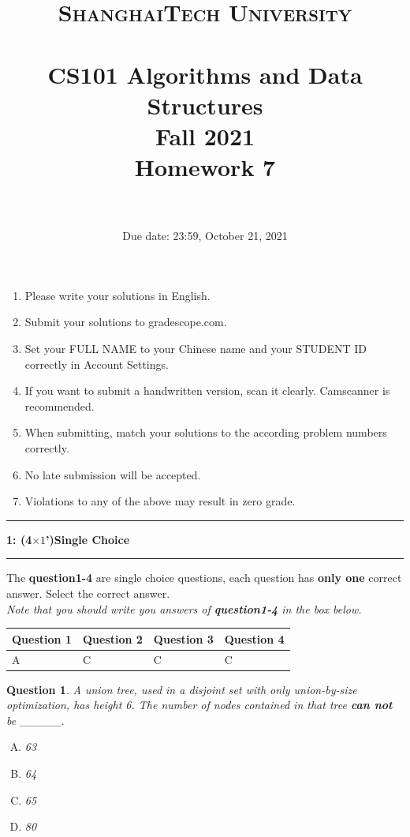 \documentclass[10.5pt]{article}
\title{
	\normalfont \normalsize
	\textsc{ShanghaiTech University} \\ [25pt]
	\horrule{0.5pt} \\[0.4cm] %
	\huge CS101 Algorithms and Data Structures\\ %
	\LARGE Fall 2021\\
	\LARGE Homework 7\\
	\horrule{2pt} \\[0.5cm] %
}
\author{}
\date{Due date: 23:59, October 21, 2021}
\newcommand\question[2]{\vspace{.25in}\hrule\textbf{#1: #2}\vspace{.5em}\hrule\vspace{.10in}}
\newtheorem{Q}{Question}
\begin{document}
\maketitle
\thispagestyle{firstpage}
\vspace{3ex}

\begin{enumerate}
	\item Please write your solutions in English.

	\item Submit your solutions to gradescope.com.

	\item Set your FULL NAME to your Chinese name and your STUDENT ID correctly in Account Settings.

	\item If you want to submit a handwritten version, scan it clearly. Camscanner is recommended.

	\item When submitting, match your solutions to the according problem numbers correctly.

	\item No late submission will be accepted.

	\item Violations to any of the above may result in zero grade.
\end{enumerate}
\newpage

\question{1}{(4$\times1$')Single Choice}


The \textbf{question1-4} are single choice questions, each question has \textbf{only one} correct answer. Select the
correct answer.\\
\textit{Note that you should write you answers of \textbf{question1-4} in the box below.}
\begin{table}[htbp]
	\begin{tabular}{|p{2cm}|p{2cm}|p{2cm}|p{2cm}|}
		\hline
		Question 1 & Question 2 & Question 3 & Question 4 \\
		\hline
		A          & C          & C          & C          \\
		\hline
	\end{tabular}
\end{table}

\begin{Q} A union tree, used in a disjoint set with only union-by-size optimization, has height 6. The number of nodes contained in that tree \textbf{can not} be \_\_\_\_\_.
	\begin{enumerate}[(A)]
		\item 63
		\item 64
		\item 65
		\item 80
	\end{enumerate}
\end{Q}
\end{document}
